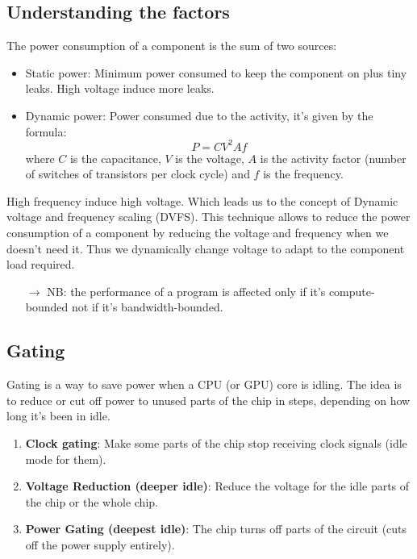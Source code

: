 \documentclass[12pt, openany]{report}
\theoremstyle{definition}
\begin{document}
\subsection{Understanding the factors}
The power consumption of a component is the sum of two sources:
\begin{itemize}
	\item Static power: Minimum power consumed to keep the component on plus tiny leaks. High voltage induce more leaks.
	\item Dynamic power: Power consumed due to the activity, it's given by the formula:
	\begin{equation}
		P = C V^2 A f
	\end{equation}
	where $C$ is the capacitance, $V$ is the voltage, $A$ is the activity factor (number of switches of transistors per clock cycle) and $f$ is the frequency.\\
\end{itemize}
High frequency induce high voltage. Which leads us to the concept of Dynamic voltage and frequency scaling (DVFS). This technique allows to reduce the power consumption of a component by reducing the voltage and frequency when we doesn't need it. Thus we dynamically change voltage to adapt to the component load required. \\
\begin{itemize}
	\item [$\rightarrow$] NB: the performance of a program is affected only if it's compute-bounded not if it's bandwidth-bounded.
\end{itemize}
\subsection{Gating}
Gating is a way to save power when a CPU (or GPU) core is idling. The idea is to reduce or cut off power to unused parts of the chip in steps, depending on how long it’s been in idle.
\begin{enumerate}
	\item \textbf{Clock gating}: Make some parts of the chip stop receiving clock signals (idle mode for them). 
	\item \textbf{Voltage Reduction (deeper idle)}: Reduce the voltage for the idle parts of the chip or the whole chip. 
	\item \textbf{Power Gating (deepest idle)}: The chip turns off parts of the circuit (cuts off the power supply entirely).
\end{enumerate}
\end{document}
